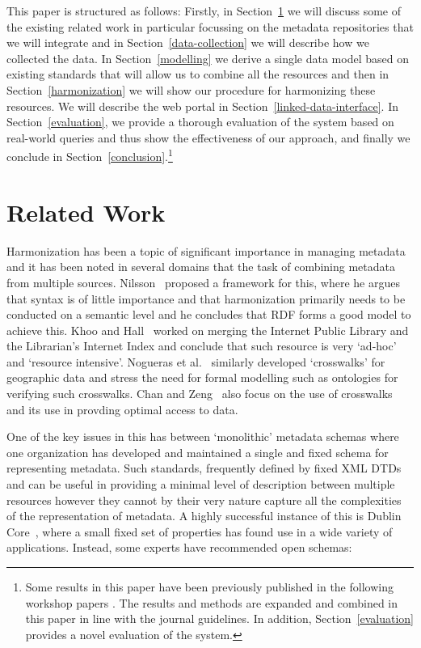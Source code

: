 \documentclass[smallextended]{svjour3}       %
\begin{document}
This paper is structured as follows: Firstly, in Section~\ref{related-work} we
will discuss some of the existing related work in particular focussing on the
metadata repositories that we will integrate and in
Section~\ref{data-collection} we will describe how we collected the data. In
Section~\ref{modelling} we derive a single data model based on existing
standards that will allow us to combine all the resources and then in
Section~\ref{harmonization} we will show our procedure for harmonizing these
resources. We will describe the web portal in
Section~\ref{linked-data-interface}. In Section~\ref{evaluation}, we provide a
thorough evaluation of the system based on real-world queries and thus show the
effectiveness of our approach, and finally we conclude in
Section~\ref{conclusion}.\footnote{Some results in this paper have been
    previously published in the following workshop papers \cite{}. The results
    and methods are expanded and combined in this paper in line with the journal
    guidelines. In addition, Section~\ref{evaluation} provides a novel
evaluation of the system.}

\section{Related Work}
\label{related-work}

Harmonization has been a topic of significant importance in managing metadata
and it has been noted in several domains that the task of combining metadata
from multiple sources. Nilsson~\cite{nilsson2010interoperability} proposed
a framework for this, where he argues that syntax is of little importance and
that harmonization primarily needs to be conducted on a semantic level and he
concludes that RDF forms a good model to achieve this. Khoo and
Hall~\cite{khoo2010merging} worked on merging the Internet Public Library and
the Librarian’s Internet Index and conclude that such resource is very
`ad-hoc' and `resource intensive'. Nogueras et
al.~\cite{nogueras2004metadata} similarly developed `crosswalks' for
geographic data and stress the need for formal modelling such as ontologies for
verifying such crosswalks. Chan and Zeng~\cite{chan2006metadata} also focus
on the use of crosswalks and its use in provding optimal access to data. 

One of the key issues in this has between `monolithic' metadata schemas where
one organization has developed and maintained a single and fixed schema for
representing metadata. Such standards, frequently defined by fixed XML DTDs and can
be useful in providing a minimal level of description between multiple resources
however they cannot by their very nature capture all the complexities of the
representation of metadata. A highly successful instance of this is Dublin
Core~\cite{weibel1998dublin}, where a small fixed set of properties has found
use in a wide variety of applications.
Instead, some experts have recommended open schemas\cite{brooks2006towards}:
\end{document}
